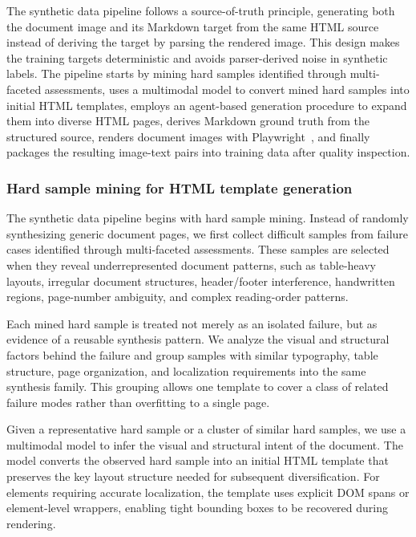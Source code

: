 The synthetic data pipeline follows a source-of-truth principle, generating both the document image and its Markdown target from the same HTML source instead of deriving the target by parsing the rendered image. This design makes the training targets deterministic and avoids parser-derived noise in synthetic labels. The pipeline starts by mining hard samples identified through multi-faceted assessments, uses a multimodal model to convert mined hard samples into initial HTML templates, employs an agent-based generation procedure to expand them into diverse HTML pages, derives Markdown ground truth from the structured source, renders document images with Playwright~\cite{playwright}, and finally packages the resulting image-text pairs into training data after quality inspection.

\subsubsection{Hard sample mining for HTML template generation}

The synthetic data pipeline begins with hard sample mining. Instead of randomly synthesizing generic document pages, we first collect difficult samples from failure cases identified through multi-faceted assessments. These samples are selected when they reveal underrepresented document patterns, such as table-heavy layouts, irregular document structures, header/footer interference, handwritten regions, page-number ambiguity, and complex reading-order patterns.

Each mined hard sample is treated not merely as an isolated failure, but as evidence of a reusable synthesis pattern. We analyze the visual and structural factors behind the failure and group samples with similar typography, table structure, page organization, and localization requirements into the same synthesis family. This grouping allows one template to cover a class of related failure modes rather than overfitting to a single page.

Given a representative hard sample or a cluster of similar hard samples, we use a multimodal model to infer the visual and structural intent of the document. The model converts the observed hard sample into an initial HTML template that preserves the key layout structure needed for subsequent diversification. For elements requiring accurate localization, the template uses explicit DOM spans or element-level wrappers, enabling tight bounding boxes to be recovered during rendering.

